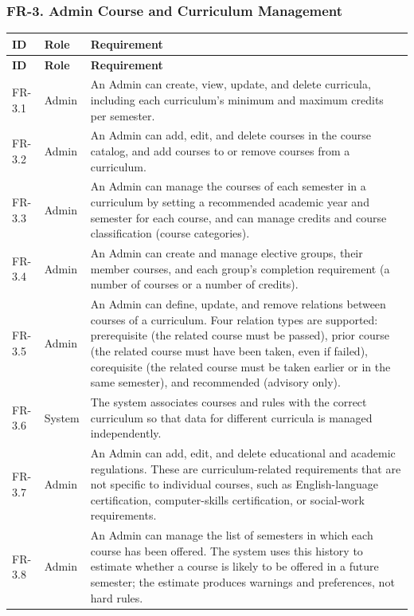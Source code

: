 \subsubsection{FR-3. Admin Course and Curriculum Management}
\begin{longtable}{|p{}|p{}|p{}|}
\hline
\textbf{ID} & \textbf{Role} & \textbf{Requirement} \\
\hline
\endfirsthead
\hline
\textbf{ID} & \textbf{Role} & \textbf{Requirement} \\
\hline
\endhead
FR-3.1 & Admin & An Admin can create, view, update, and delete curricula, including each curriculum's minimum and maximum credits per semester. \\
\hline
FR-3.2 & Admin & An Admin can add, edit, and delete courses in the course catalog, and add courses to or remove courses from a curriculum. \\
\hline
FR-3.3 & Admin & An Admin can manage the courses of each semester in a curriculum by setting a recommended academic year and semester for each course, and can manage credits and course classification (course categories). \\
\hline
FR-3.4 & Admin & An Admin can create and manage elective groups, their member courses, and each group's completion requirement (a number of courses or a number of credits). \\
\hline
FR-3.5 & Admin & An Admin can define, update, and remove relations between courses of a curriculum. Four relation types are supported: prerequisite (the related course must be passed), prior course (the related course must have been taken, even if failed), corequisite (the related course must be taken earlier or in the same semester), and recommended (advisory only). \\
\hline
FR-3.6 & System & The system associates courses and rules with the correct curriculum so that data for different curricula is managed independently. \\
\hline
FR-3.7 & Admin & An Admin can add, edit, and delete educational and academic regulations. These are curriculum-related requirements that are not specific to individual courses, such as English-language certification, computer-skills certification, or social-work requirements. \\
\hline
FR-3.8 & Admin & An Admin can manage the list of semesters in which each course has been offered. The system uses this history to estimate whether a course is likely to be offered in a future semester; the estimate produces warnings and preferences, not hard rules. \\

\end{longtable}
